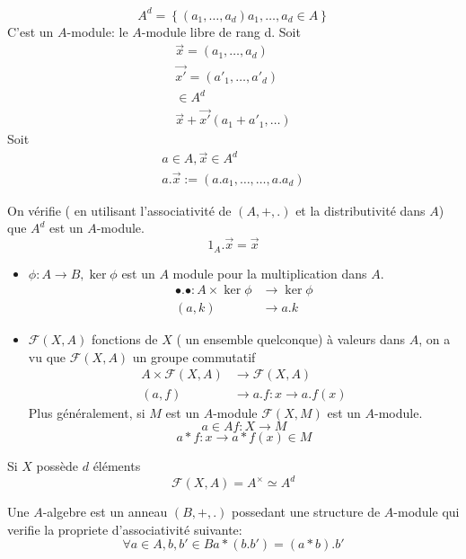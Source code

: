 \documentclass[../main.tex]{subfiles}
\begin{document}
 \[ 
	 A^{d}= \left\{ ( a_1,\ldots, a_d) a_1,\ldots, a_d \in A\right\}  
\]
C'est un $A$-module: le $A$-module libre de rang d.
Soit
\begin{align*}
	\vec{x}=(a_1,\ldots,a_d)\\
	\vec{x'}=(a'_1,\ldots,a'_d)\\
	\in A^{d}\\
	\vec{x} + \vec{x'} ( a_1+a'_1 , \ldots)
\end{align*}
Soit
\begin{align*}
a\in A, \vec{x} \in A^{d}\\
a.\vec{x} := ( a.a_1,\ldots, \ldots,a.a_d)
\end{align*}

On vérifie ( en utilisant l'associativité de $(A,+, .)$ et la distributivité dans $A$)
que $A^{d}$ est un $A$-module.
\[ 
1_A. \vec{x}= \vec{x}
\]
\begin{exemples}
\begin{itemize}
\item $\phi: A\to B , \ker \phi$ est un $A$ module pour la multiplication dans $A$.
	\begin{align*}
		\bullet.\bullet: A\times \ker \phi &\to \ker\phi\\
	( a,k)&\to a.k
	\end{align*}
	

\item $\mathcal{F}(X,A)$ fonctions de $X$ ( un ensemble quelconque) à valeurs dans $A$, on a vu que $\mathcal{F}(X,A)$ un groupe commutatif
	\begin{align*}
		A\times \mathcal{F}(X,A) &\to \mathcal{F}(X,A)\\
		( a,f)&\to a.f:x\to a.f(x)
	\end{align*}
	Plus généralement, si $M$ est un $A$-module $\mathcal{F}(X,M)$ est un $A$-module.
	\[ 
	a \in A f:X\to M
	\]
\[ 
	a\ast f: x \to a\ast f(x) \in M
\]
\end{itemize}

	\begin{rmq}
	Si $X$ possède $d$ éléments
	\[ 
		\mathcal{F}(X,A) = A^{\times} \simeq A^{d}
	\]
	
	\end{rmq}
\end{exemples}
\begin{defn}[$A$-Algebre]\label{defn:_a_algebre}
	Une $A$-algebre est un anneau $(B,+,.)$ possedant une structure de $A$-module qui verifie la propriete d'associativité suivante:
	\[ 
		\forall a \in A, b,b' \in B a \ast ( b.b')= ( a \ast b).b'
	\]
	
\end{defn}
\end{document}
